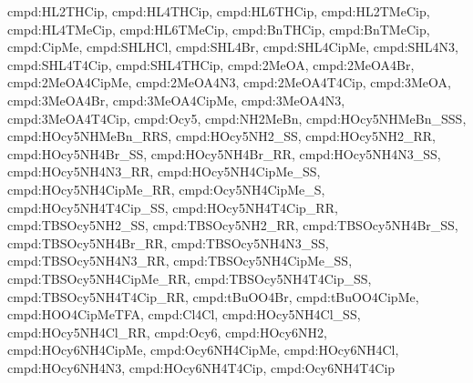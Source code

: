 {cmpd:HL2THCip, cmpd:HL4THCip, cmpd:HL6THCip, 
cmpd:HL2TMeCip, cmpd:HL4TMeCip, cmpd:HL6TMeCip, 
cmpd:BnTHCip, cmpd:BnTMeCip, 
cmpd:CipMe, cmpd:SHLHCl, cmpd:SHL4Br, cmpd:SHL4CipMe, cmpd:SHL4N3, cmpd:SHL4T4Cip, cmpd:SHL4THCip, 
cmpd:2MeOA, cmpd:2MeOA4Br, cmpd:2MeOA4CipMe, cmpd:2MeOA4N3, cmpd:2MeOA4T4Cip, 
cmpd:3MeOA, cmpd:3MeOA4Br, cmpd:3MeOA4CipMe, cmpd:3MeOA4N3, cmpd:3MeOA4T4Cip, 
cmpd:Ocy5, cmpd:NH2MeBn, cmpd:HOcy5NHMeBn_SSS, cmpd:HOcy5NHMeBn_RRS, cmpd:HOcy5NH2_SS, cmpd:HOcy5NH2_RR, 
cmpd:HOcy5NH4Br_SS, cmpd:HOcy5NH4Br_RR, 
cmpd:HOcy5NH4N3_SS, cmpd:HOcy5NH4N3_RR, 
cmpd:HOcy5NH4CipMe_SS, cmpd:HOcy5NH4CipMe_RR, 
cmpd:Ocy5NH4CipMe_S, 
cmpd:HOcy5NH4T4Cip_SS, cmpd:HOcy5NH4T4Cip_RR, 
cmpd:TBSOcy5NH2_SS, cmpd:TBSOcy5NH2_RR, 
cmpd:TBSOcy5NH4Br_SS, cmpd:TBSOcy5NH4Br_RR, 
cmpd:TBSOcy5NH4N3_SS, cmpd:TBSOcy5NH4N3_RR, 
cmpd:TBSOcy5NH4CipMe_SS, cmpd:TBSOcy5NH4CipMe_RR, 
cmpd:TBSOcy5NH4T4Cip_SS, cmpd:TBSOcy5NH4T4Cip_RR, 
cmpd:tBuOO4Br, cmpd:tBuOO4CipMe, cmpd:HOO4CipMeTFA,
cmpd:Cl4Cl, cmpd:HOcy5NH4Cl_SS, cmpd:HOcy5NH4Cl_RR,  
cmpd:Ocy6, cmpd:HOcy6NH2, cmpd:HOcy6NH4CipMe, cmpd:Ocy6NH4CipMe, cmpd:HOcy6NH4Cl, cmpd:HOcy6NH4N3, cmpd:HOcy6NH4T4Cip, cmpd:Ocy6NH4T4Cip}
